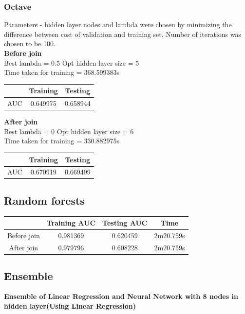 \documentclass[10pt]{article}
\begin{document}
\subsubsection{Octave}
Parameters - hidden layer nodes and lambda were chosen by minimizing the difference between cost of validation and training set. Number of iterations was chosen to be 100.\\
\textbf{Before join}\\
	Best lambda = 0.5 Opt hidden layer size = 5 \\
	Time taken for training = 368.599383s
\begin{center}
 \begin{tabular}{|c | c | c ||} 
 \hline
 & Training & Testing\\ [0.5ex] 
 \hline\hline
AUC & 0.649975 & 0.658944\\
 \hline
\end{tabular}
\end{center}
\textbf{After join}\\
	Best lambda = 0 Opt hidden layer size = 6\\ 
	Time taken for training = 330.882975s
\begin{center}
 \begin{tabular}{|c | c | c ||} 
 \hline
 & Training & Testing\\ [0.5ex] 
 \hline\hline
AUC & 0.670919 & 0.669499\\
 \hline
\end{tabular}
\end{center}


\subsection{Random forests}

\begin{center}
 \begin{tabular}{|c | c | c | c||} 
 \hline
 & Training AUC & Testing AUC & Time\\ [0.5ex] 
 \hline\hline
Before join & 0.981369 & 0.620459 & 2m20.759s\\
 \hline
After join & 0.979796 & 0.608228 & 2m20.759s\\ 
 \hline
\end{tabular}
\end{center}

\subsection{Ensemble}
\textbf{Ensemble of Linear Regression and Neural Network with 8 nodes in hidden layer(Using Linear Regression)}\\
\end{document}
